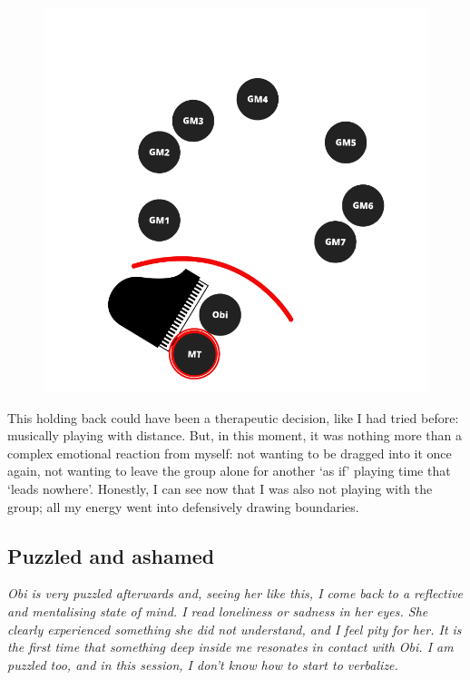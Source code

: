 \documentclass[authordate, empirical]{jote-new-article}
\begin{document}
\begin{figure}


  \includegraphics[width=\linewidth]{media/image2.png}

  \caption{}

  \label{fig:rId6}


\end{figure}



This holding back could have been a therapeutic decision, like I had tried before: musically playing with distance. But, in this moment, it was nothing more than a complex emotional reaction from myself: not wanting to be dragged into it once again, not wanting to leave the group alone for another ‘as if' playing time that ‘leads nowhere'. Honestly, I can see now that I was also not playing with the group; all my energy went into defensively drawing boundaries.







\subsection{Puzzled and ashamed}



{\emph{Obi is very puzzled afterwards and, seeing her like this, I come back to a reflective and mentalising state of mind. I read loneliness or sadness in her eyes. She clearly experienced something she did not understand, and I feel pity for her. It is the first time that something deep inside me resonates in contact with Obi. I am puzzled too, and in this session, I don't know how to start to verbalize.}}
\end{document}
